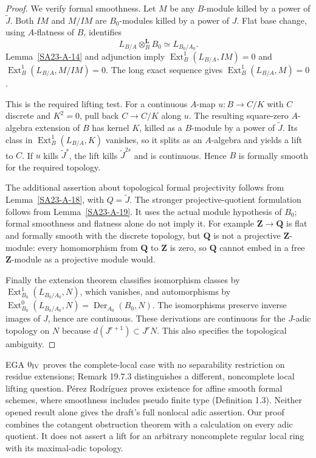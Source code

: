 \begin{proof}
We verify formal smoothness. Let $M$ be any $B$-module killed by
a power of $\widetilde J$. Both $IM$ and $M/IM$ are
$B_0$-modules killed by a power of $J$. Flat base change, using
$A$-flatness of $B$, identifies
\[
 L_{B/A}\otimes_B^{\mathbf L}B_0\simeq L_{B_0/A_0}.
\]
Lemma~\ref{SA23-A-14} and adjunction imply
$\operatorname{Ext}^1_B(L_{B/A},IM)=0$ and
$\operatorname{Ext}^1_B(L_{B/A},M/IM)=0$.
The long exact sequence gives
$\operatorname{Ext}^1_B(L_{B/A},M)=0$.

This is the required lifting test. For a continuous $A$-map
$u:B\to C/K$ with $C$ discrete and $K^2=0$, pull back
$C\to C/K$ along $u$. The resulting square-zero $A$-algebra
extension of $B$ has kernel $K$, killed as a $B$-module by a power
of $\widetilde J$. Its class in
$\operatorname{Ext}^1_B(L_{B/A},K)$ vanishes, so it splits as an
$A$-algebra and yields a lift to $C$. If $u$ kills
$\widetilde J^s$, the lift kills $\widetilde J^{2s}$ and is
continuous. Hence $B$ is formally smooth for the required topology.

The additional assertion about topological formal projectivity
follows from Lemma~\ref{SA23-A-18}, with $Q=\widetilde J$.
The stronger projective-quotient formulation follows from
Lemma~\ref{SA23-A-19}.
It uses the actual module hypothesis of $B_0$; formal smoothness
and flatness alone do not imply it. For example
$\mathbf Z\to\mathbf Q$ is flat and formally smooth with the
discrete topology, but $\mathbf Q$ is not a projective
$\mathbf Z$-module: every homomorphism from $\mathbf Q$ to
$\mathbf Z$ is zero, so $\mathbf Q$ cannot embed in a free
$\mathbf Z$-module as a projective module would.

Finally the extension theorem classifies isomorphism classes by
$\operatorname{Ext}^1_{B_0}(L_{B_0/A_0},N)$, which vanishes,
and automorphisms by
$\operatorname{Ext}^0_{B_0}(L_{B_0/A_0},N)
=\operatorname{Der}_{A_0}(B_0,N)$.
The isomorphisms preserve inverse images of $J$, hence are
continuous. These derivations are continuous for the $J$-adic
topology on $N$ because $d(J^{r+1})\subset J^rN$.
This also specifies the topological ambiguity.
\end{proof}

\begin{remark}
\label{SA23-A-17}
EGA $0_{\rm IV}$ \cite[19.7.2, printed pp.~108--109]{algEGAIV1} proves the
complete-local case with no separability restriction on residue
extensions; Remark 19.7.3 distinguishes a different, noncomplete
local lifting question. P\'erez Rodr\'iguez
\cite[Corollary 4.3]{rootPerez2008} proves existence for affine
smooth formal schemes, where smoothness includes pseudo finite
type (Definition 1.3). Neither opened result alone gives the
draft's full nonlocal adic assertion. Our proof combines the
cotangent obstruction theorem with a calculation on every adic
quotient. It does not assert a lift for an arbitrary noncomplete
regular local ring with its maximal-adic topology.
\end{remark}

